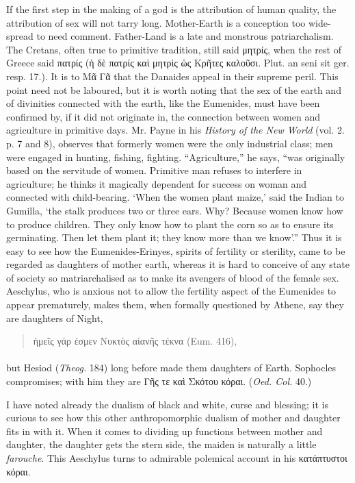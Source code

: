 \documentclass[a4paper, 11pt, oneside, polutonikogreek, english]{article}
\begin{document}
If the first step in the making of a god is the attribution of human quality, the attribution of sex will not tarry long. Mother-Earth is a conception too wide-spread to need comment. Father-Land is a late and monstrous patriarchalism. The Cretans, often true to primitive tradition, still said μητρίς, when the rest of Greece said πατρίς (ἡ δὲ πατρίς καὶ μητρὶς ὡς Κρῆτες καλοῦσι. Plut. an seni sit ger. resp. 17.). It is to Μᾶ Γᾶ that the Danaides appeal in their supreme peril. This point need not be laboured, but it is worth noting that the sex of the earth and of divinities connected with the earth, like the Eumenides, must have been confirmed by, if it did not originate in, the connection between women and agriculture in primitive days. Mr. Payne in his \emph{History of the New World} (vol. 2. p. 7 and 8), observes that formerly women were the only industrial class; men were engaged in hunting, fishing, fighting. ``Agriculture,'' he says, ``was originally based on the servitude of women. Primitive man refuses to interfere in agriculture; he thinks it magically dependent for success on woman and connected with child-bearing. `When the women plant maize,' said the Indian to Gumilla, `the stalk produces two or three ears. Why? Because women know how to produce children. They only know how to plant the corn so as to ensure its germinating. Then let them plant it; they know more than we know'.'' Thus it is easy to see how the Eumenides-Erinyes, spirits of fertility or sterility, came to be regarded as daughters of mother earth, whereas it is hard to conceive of any state of society so matriarchalised as to make its avengers of blood of the female sex. Aeschylus, who is anxious not to allow the fertility aspect of the Eumenides to appear prematurely, makes them, when formally questioned by Athene, say they are daughters of Night,
\begin{quotation}
\large
ἡμεῖς γάρ ἐσμεν Νυκτὸς αἰανῆς τέκνα (Eum. 416),
\end{quotation}
\paragraph{}
but Hesiod (\emph{Theog.} 184) long before made them daughters of Earth. Sophocles compromises; with him they are Γῆς τε καὶ Σκότου κόραι. (\emph{Oed. Col.} 40.)

I have noted already the dualism of black and white, curse and blessing; it is curious to see how this other anthropomorphic dualism of mother and daughter fits in with it. When it comes to dividing up functions between mother and daughter, the daughter gets the stern side, the maiden is naturally a little \emph{farouche}. This Aeschylus turns to admirable polemical account in his κατάπτυστοι κόραι.
\end{document}
